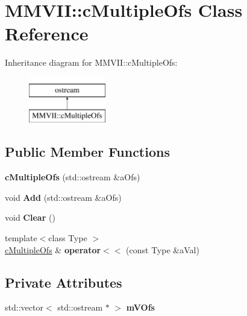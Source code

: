 \hypertarget{classMMVII_1_1cMultipleOfs}{}\section{M\+M\+V\+II\+:\+:c\+Multiple\+Ofs Class Reference}
\label{classMMVII_1_1cMultipleOfs}
Inheritance diagram for M\+M\+V\+II\+:\+:c\+Multiple\+Ofs\+:\begin{figure}[H]
\begin{center}
\leavevmode
\includegraphics[height=2.000000cm]{classMMVII_1_1cMultipleOfs}
\end{center}
\end{figure}
\subsection*{Public Member Functions}
\begin{DoxyCompactItemize}
\item 
{\bfseries c\+Multiple\+Ofs} (std\+::ostream \&a\+Ofs)\hypertarget{classMMVII_1_1cMultipleOfs_a43e3d23cd99d233782f89655838805a7}{}\label{classMMVII_1_1cMultipleOfs_a43e3d23cd99d233782f89655838805a7}

\item 
void {\bfseries Add} (std\+::ostream \&a\+Ofs)\hypertarget{classMMVII_1_1cMultipleOfs_ac3d1304ad8705d4de7d47fc0749c3fb4}{}\label{classMMVII_1_1cMultipleOfs_ac3d1304ad8705d4de7d47fc0749c3fb4}

\item 
void {\bfseries Clear} ()\hypertarget{classMMVII_1_1cMultipleOfs_aeabfa043302c54c9b65bca0d537753a0}{}\label{classMMVII_1_1cMultipleOfs_aeabfa043302c54c9b65bca0d537753a0}

\item 
{\footnotesize template$<$class Type $>$ }\\\hyperlink{classMMVII_1_1cMultipleOfs}{c\+Multiple\+Ofs} \& {\bfseries operator$<$$<$} (const Type \&a\+Val)\hypertarget{classMMVII_1_1cMultipleOfs_a69344fdb3673f37c610c20f29be8a219}{}\label{classMMVII_1_1cMultipleOfs_a69344fdb3673f37c610c20f29be8a219}

\end{DoxyCompactItemize}
\subsection*{Private Attributes}
\begin{DoxyCompactItemize}
\item 
std\+::vector$<$ std\+::ostream $\ast$ $>$ {\bfseries m\+V\+Ofs}\hypertarget{classMMVII_1_1cMultipleOfs_acf3bd228f72f44cc726d1b5542927793}{}\label{classMMVII_1_1cMultipleOfs_acf3bd228f72f44cc726d1b5542927793}

\end{DoxyCompactItemize}


